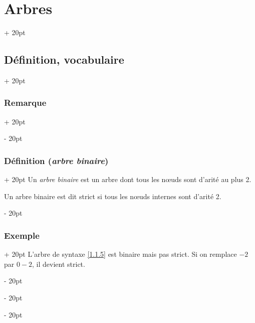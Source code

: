 \documentclass[a4paper, 12pt, twoside]{article}
\newcommand{\ind}[1][20pt]{\advance\leftskip + #1}
\newcommand{\deind}[1][20pt]{\advance\leftskip - #1}
\newenvironment{indt}[2][20pt]{#2 \par \ind[#1]}{\par \deind} %
\begin{document}
\begin{indt}{\section{Arbres}}
\begin{indt}{\subsection{Définition, vocabulaire}}
\begin{indt}{\subsubsection{Remarque}}
\begin{center}
                \end{center}
            \end{indt}
            
            \vspace{12pt}
            
            \begin{indt}{\subsubsection{Définition (\textit{arbre binaire})}}
                Un \textit{arbre binaire} est un arbre dont tous les n\oe uds sont d'arité au plus 2.
                
                Un arbre binaire est dit strict si tous les n\oe uds internes sont d'arité 2.
            \end{indt}
            
            \vspace{12pt}
            
            \begin{indt}{\subsubsection{Exemple}}
                L'arbre de syntaxe \ref{1.1.5} est binaire mais pas strict. Si on remplace $-2$ par $0 - 2$, il devient strict.
            \end{indt}
            

\end{indt}
\end{indt}
\end{document}
